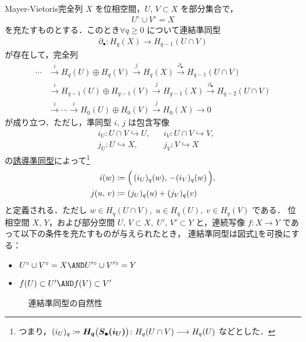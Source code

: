 \documentclass[algtopo_main]{subfiles}
\begin{document}
\begin{mytheo}[label=thm:MV, breakable]{Mayer-Vietoris完全列}
    $X$ を位相空間，$U,\, V \subset X$ を部分集合で，
    \begin{align}
        U^\circ \cup V^\circ = X
    \end{align}
    を充たすものとする．このとき$\forall q \ge 0$ について連結準同型
    \begin{align}
        \partial_\bullet \colon H_q(X) \longrightarrow H_{q-1}(U \cap V)
    \end{align}
    が存在して，完全列
    \begin{align}
        \cdots &\xrightarrow{i} H_q(U) \oplus H_q(V) \xrightarrow{j} H_q(X) \xrightarrow{\partial_\bullet} H_{q-1}(U \cap V) \\
        &\xrightarrow{i} H_{q-1}(U) \oplus H_{q-1}(V) \xrightarrow{j} H_{q-1}(X) \xrightarrow{\partial_\bullet} H_{q-2}(U \cap V) \\
        &\xrightarrow{i} \cdots \xrightarrow{i} H_0(U) \oplus H_0(V) \xrightarrow{j} H_0(X) \to 0
    \end{align}
    が成り立つ．ただし，準同型 $i,\, j$ は包含写像
    \begin{align}
        &i_U \colon U\cap V \hookrightarrow U,&&i_V \colon U\cap V \hookrightarrow V,\\ 
        &j_U \colon U \hookrightarrow X,&&j_V \colon V \hookrightarrow X
    \end{align}
    の\hyperref[def:SCC]{誘導準同型}によって\footnote{つまり，$(i_U)_q \coloneqq \bm{H_q \bigl( S_\bullet (i_U) \bigr)} \colon H_q(U\cap V) \longrightarrow H_q(U)$ などとした．}
    \begin{align}
        i(w) &\coloneqq \Bigl(\, (i_U)_q(w),\, -(i_V)_q(w) \,\Bigr), \\
        j(u,\, v) &\coloneqq (j_U)_q(u) + (j_V)_q(v)
    \end{align}
    と定義される．ただし $w \in H_q(U\cap V),\; u \in H_q(U),\; v \in H_q(V)$ である．
    \tcblower
    位相空間 $X,\, Y$，および部分空間 $U,\, V \subset X,\; U',\, V' \subset Y$ と，連続写像 $f \colon X \longrightarrow Y$ であって以下の条件を充たすものが与えられたとき，
    連結準同型は図式\ref{fig:connecting-MV}を可換にする：
    \begin{itemize}
        \item $U^\circ \cup V^\circ = X \AND U'{}^\circ \cup V'{}^\circ = Y$
        \item $f(U) \subset U' \AND f(V) \subset V'$
    \end{itemize}

\begin{figure}[H]
    \centering
    \caption{連結準同型の自然性}
    \label{fig:connecting-MV}
\end{figure}%
\end{mytheo}
\end{document}
